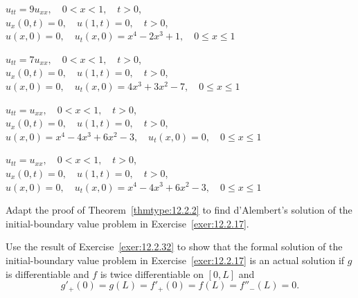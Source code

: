 \begin{exerciselist}
  \item\label{exer:12.2.28} $u_{tt}=9u_{xx},\quad0<x<1,\quad t>0$,\\ $u_{x}(0,t)=0,\quad u(1,t)=0,\quad t>0$,\\ $u(x,0)=0,\quad u_{t}(x,0)=x^{4}-2x^{3}+1,\quad0\le x\le1$

  \item\label{exer:12.2.29} \Cex $u_{tt}=7u_{xx},\quad0<x<1,\quad t>0$,\\ $u_{x}(0,t)=0,\quad u(1,t)=0,\quad t>0$,\\ $u(x,0)=0,\quad u_{t}(x,0)=4x^{3}+3x^{2}-7,\quad0\le x\le1$

  \item\label{exer:12.2.30} $u_{tt}=u_{xx},\quad0<x<1,\quad t>0$,\\ $u_{x}(0,t)=0,\quad u(1,t)=0,\quad t>0$,\\ $u(x,0)=x^{4}-4x^{3}+6x^{2}-3,\quad u_{t}(x,0)=0,\quad0\le x\le1$

  \item\label{exer:12.2.31} $u_{tt}=u_{xx},\quad0<x<1,\quad t>0$,\\ $u_{x}(0,t)=0,\quad u(1,t)=0,\quad t>0$,\\ $u(x,0)=0,\quad u_{t}(x,0)=x^{4}-4x^{3}+6x^{2}-3,\quad0\le x\le1$

  \item\label{exer:12.2.32} Adapt the proof of Theorem~\ref{thmtype:12.2.2} to find d'Alembert's
        solution of the initial-boundary value problem in Exercise~\ref{exer:12.2.17}.

  \item\label{exer:12.2.33} Use the result of Exercise~\ref{exer:12.2.32} to show that the formal
        solution of the initial-boundary value problem in Exercise~\ref{exer:12.2.17} is an actual
        solution if $g$ is differentiable and $f$ is twice differentiable on $[0,L]$ and
  \[
    g'_{+}(0)=g(L)=f'_{+}(0)=f(L)=f''_{-}(L)=0.
  \]


\end{exerciselist}
